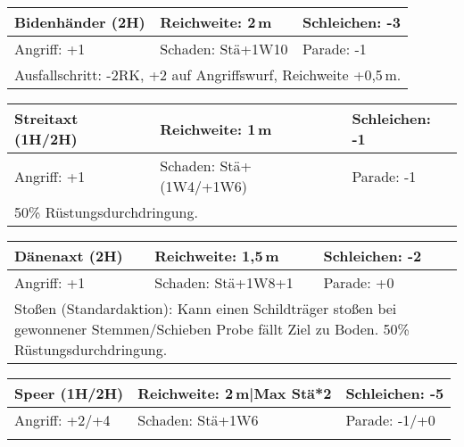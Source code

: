 \documentclass[../../Heldenanleitung2]{subfiles}
\begin{document}
\newline \newline\newline
\begin{tabular}{|p{}|p{}|p{}|}
\hline
\textbf{Bidenhänder (2H)} & Reichweite: 2\,m & Schleichen: -3\\
\hline
Angriff: +1 & Schaden: Stä+1W10 & Parade: -1\\
\hline
\multicolumn{3}{|p{0.99\textwidth}|}{Ausfallschritt: -2RK, +2 auf Angriffswurf, Reichweite +0,5\,m.} \\
\hline
\end{tabular}
\newline \newline\newline
\begin{tabular}{|p{}|p{}|p{}|}
\hline
\textbf{Streitaxt (1H/2H)} & Reichweite: 1\,m & Schleichen: -1\\
\hline
Angriff: +1 & Schaden: Stä+(1W4/+1W6) & Parade: -1\\
\hline
\multicolumn{3}{|p{0.99\textwidth}|}{50\% Rüstungsdurchdringung.} \\
\hline
\end{tabular}
\newline \newline\newline
\begin{tabular}{|p{}|p{}|p{}|}
\hline
\textbf{Dänenaxt (2H)} & Reichweite: 1,5\,m & Schleichen: -2\\
\hline
Angriff: +1 & Schaden: Stä+1W8+1 & Parade: +0\\
\hline
\multicolumn{3}{|p{0.99\textwidth}|}{Stoßen (Standardaktion): Kann einen Schildträger stoßen bei gewonnener Stemmen/Schieben Probe fällt Ziel zu Boden. 50\% Rüstungsdurchdringung.} \\
\hline
\end{tabular}
\newline \newline\newline
\begin{tabular}{|p{}|p{}|p{}|}
\hline
\textbf{Speer (1H/2H)} & Reichweite: 2\,m|Max Stä*2 & Schleichen: -5\\
\hline
Angriff: +2/+4 & Schaden: Stä+1W6 & Parade: -1/+0\\
\hline
\multicolumn{3}{|p{0.99\textwidth}|}{} \\
\hline
\end{tabular}
\end{document}
